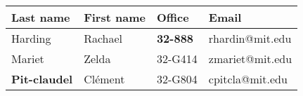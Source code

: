 \newcommand{\outlier}[1]{\textbf{#1}}
\begin{block}{}
  \small
  \renewcommand{\arraystretch}{1.2}
  \setlength\tabcolsep{3\tabcolsep}
  \begin{tabular*}{\textwidth}{ l | l | l | l }
    Last name & First name & Office & Email \\
    \hline
    Harding & Rachael & \outlier{32-888} & rhardin@mit.edu \\
    Mariet & Zelda & 32-G414 & zmariet@mit.edu \\
    \outlier{Pit-claudel} & Clément & 32-G804 & cpitcla@mit.edu \\
  \end{tabular*}
\end{block}
